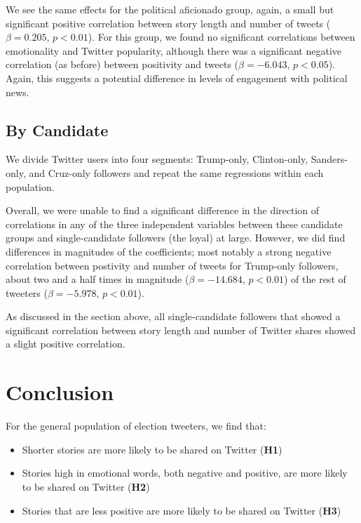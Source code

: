 \documentclass[letterpaper]{article}
\begin{document}
We see the same effects for the political aficionado group, again, a small but significant positive correlation between story length and number of tweets ($\beta=0.205$, $p<0.01$). For this group, we found no significant correlations between emotionality and Twitter popularity, although there was a significant negative correlation (as before) between positivity and tweets ($\beta=-6.043$, $p<0.05$). Again, this suggests a potential difference in levels of engagement with political news. 

\subsection{By Candidate} 

We divide Twitter users into four segments: Trump-only, Clinton-only, Sanders-only, and Cruz-only followers and repeat the same regressions within each population. 

Overall, we were unable to find a significant difference in the direction of correlations in any of the three independent variables between these candidate groups and single-candidate followers (the loyal) at large. However, we did find differences in magnitudes of the coefficients; most notably a strong negative correlation between postivity and number of tweets for Trump-only followers, about two and a half times in magnitude ($\beta=-14.684$, $p<0.01$) of the rest of tweeters ($\beta=−5.978$, $p<0.01$). 

As discussed in the section above, all single-candidate followers that showed a significant correlation between story length and number of Twitter shares showed a slight positive correlation.

\section{Conclusion}

For the general population of election tweeters, we find that:
\begin{itemize}
    \item Shorter stories are more likely to be shared on Twitter (\textbf{H1})
    \item Stories high in emotional words, both negative and positive, are more likely to be shared on Twitter (\textbf{H2})
    \item Stories that are less positive are more likely to be shared on Twitter (\textbf{H3})
\end{itemize}
\end{document}
